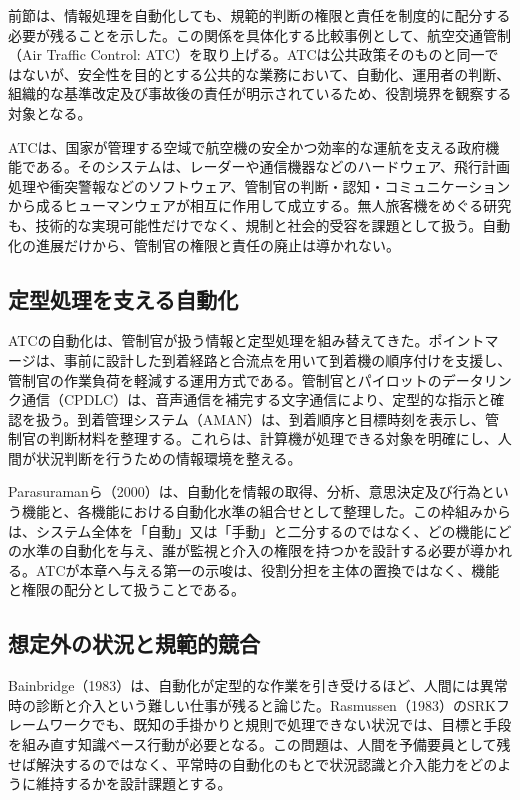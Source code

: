 前節は、情報処理を自動化しても、規範的判断の権限と責任を制度的に配分する必要が残ることを示した。この関係を具体化する比較事例として、航空交通管制（Air Traffic Control: ATC）を取り上げる。ATCは公共政策そのものと同一ではないが、安全性を目的とする公共的な業務において、自動化、運用者の判断、組織的な基準改定及び事故後の責任が明示されているため、役割境界を観察する対象となる。

ATCは、国家が管理する空域で航空機の安全かつ効率的な運航を支える政府機能である\cite{ito2025atm}。そのシステムは、レーダーや通信機器などのハードウェア、飛行計画処理や衝突警報などのソフトウェア、管制官の判断・認知・コミュニケーションから成るヒューマンウェアが相互に作用して成立する\cite{xia2026systematic}。無人旅客機をめぐる研究も、技術的な実現可能性だけでなく、規制と社会的受容を課題として扱う\cite{elbasyouny2025pilotless}。自動化の進展だけから、管制官の権限と責任の廃止は導かれない。

\subsection{定型処理を支える自動化}

ATCの自動化は、管制官が扱う情報と定型処理を組み替えてきた。ポイントマージは、事前に設計した到着経路と合流点を用いて到着機の順序付けを支援し、管制官の作業負荷を軽減する運用方式である\cite{ito2025atm}。管制官とパイロットのデータリンク通信（CPDLC）は、音声通信を補完する文字通信により、定型的な指示と確認を扱う\cite{pramono2024cpdlc}。到着管理システム（AMAN）は、到着順序と目標時刻を表示し、管制官の判断材料を整理する\cite{ito2025atm}。これらは、計算機が処理できる対象を明確にし、人間が状況判断を行うための情報環境を整える。

Parasuramanら（2000）は、自動化を情報の取得、分析、意思決定及び行為という機能と、各機能における自動化水準の組合せとして整理した\cite{parasuraman2000model}。この枠組みからは、システム全体を「自動」又は「手動」と二分するのではなく、どの機能にどの水準の自動化を与え、誰が監視と介入の権限を持つかを設計する必要が導かれる。ATCが本章へ与える第一の示唆は、役割分担を主体の置換ではなく、機能と権限の配分として扱うことである。

\subsection{想定外の状況と規範的競合}

Bainbridge（1983）は、自動化が定型的な作業を引き受けるほど、人間には異常時の診断と介入という難しい仕事が残ると論じた\cite{bainbridge1983ironies}。Rasmussen（1983）のSRKフレームワークでも、既知の手掛かりと規則で処理できない状況では、目標と手段を組み直す知識ベース行動が必要となる\cite{rasmussen1983srk}。この問題は、人間を予備要員として残せば解決するのではなく、平常時の自動化のもとで状況認識と介入能力をどのように維持するかを設計課題とする。


